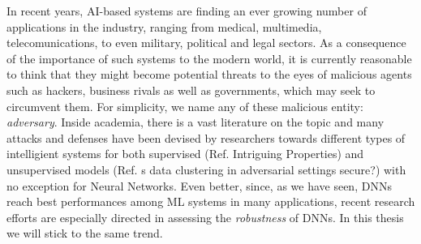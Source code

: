 \documentclass[LaM,binding=0.6cm]{./packages/sapthesis/sapthesis}
\begin{document}
    In recent years, AI-based systems are finding an ever growing number of applications in the industry, ranging from medical, multimedia, telecomunications, to even military, political and legal sectors. 
    As a consequence of the importance of such systems to the modern world, it is currently reasonable to think that they might become potential threats to the eyes of
    malicious agents such as hackers, business rivals as well as governments, which may seek to circumvent them. For simplicity, we name any of these malicious entity: \textit{adversary}. 
    Inside academia, there is a vast literature on the topic and many attacks and defenses have been devised by researchers towards different types of intelligient systems for both supervised (Ref. Intriguing Properties)
    and unsupervised models (Ref. s data clustering in adversarial settings secure?) with no exception for Neural Networks. Even better, since, as we have seen, DNNs reach best performances among ML systems 
    in many applications, recent research efforts are especially directed in assessing the \textit{robustness} of DNNs. In this thesis we will stick to the same trend.
\end{document}
